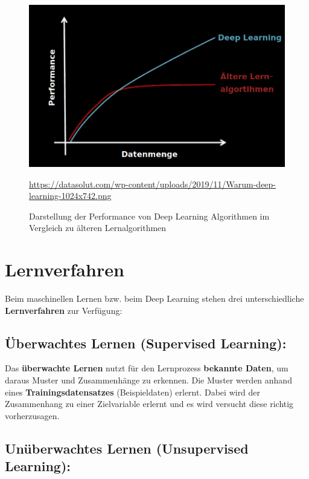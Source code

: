 \begin{figure}[H]
	\centering
	\includegraphics[scale=0.4]{kapitel3/images/Deep_Learning_Performance.png}
	\label{fig:deep-learning-performance}
	\caption{Darstellung der Performance von Deep Learning Algorithmen im Vergleich zu älteren Lernalgorithmen}
	\vspace{0.2cm}
	\quelle\url{https://datasolut.com/wp-content/uploads/2019/11/Warum-deep-learning-1024x742.png}
\end{figure}

\section{Lernverfahren}

Beim maschinellen Lernen bzw. beim Deep Learning stehen drei unterschiedliche \textbf{Lernverfahren} zur Verfügung:

\subsection{Überwachtes Lernen (Supervised Learning):}

	Das \textbf{überwachte Lernen} nutzt für den Lernprozess \textbf{bekannte Daten}, um daraus Muster und Zusammenhänge zu erkennen. Die Muster werden  anhand eines \textbf{Trainingsdatensatzes} (Beispieldaten) erlernt. Dabei wird der Zusammenhang zu einer Zielvariable erlernt und es wird versucht diese richtig vorherzusagen. \cite{datasolut3}

\subsection{Unüberwachtes Lernen (Unsupervised Learning):}


